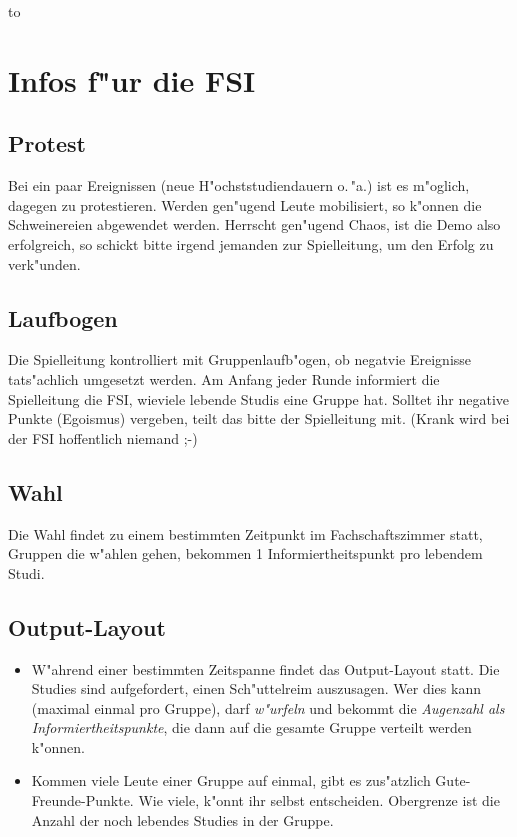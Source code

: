 \documentclass[12pt,a4paper]{article}
\begin{document}
\hbox to\textwidth{\hfill\small vertraulich}


\section*{Infos f"ur die FSI}

\subsection*{Protest}

Bei ein paar Ereignissen (neue H"ochststudiendauern o.\,"a.) ist 
es m"oglich, dagegen zu protestieren. Werden gen"ugend Leute 
mobilisiert, so k"onnen die Schweinereien abgewendet werden. 
Herrscht gen"ugend Chaos, ist die Demo also erfolgreich, so schickt 
bitte irgend jemanden zur Spielleitung, um den Erfolg zu verk"unden.

\subsection*{Laufbogen}

Die Spielleitung kontrolliert mit Gruppenlaufb"ogen, ob
negatvie Ereignisse tats"achlich umgesetzt werden. Am Anfang jeder
Runde informiert die Spielleitung die FSI, wieviele lebende Studis
eine Gruppe hat. Solltet ihr negative Punkte (Egoismus) vergeben,
teilt das bitte der Spielleitung mit. (Krank wird bei der FSI
hoffentlich niemand ;-)


\subsection*{Wahl}

Die Wahl findet zu einem bestimmten Zeitpunkt im Fachschaftszimmer statt,
Gruppen die w"ahlen gehen, bekommen 1 Informiertheitspunkt pro lebendem
Studi.

\subsection*{Output-Layout}

\begin{itemize}
\item
W"ahrend einer bestimmten Zeitspanne findet das Output-Layout statt.
Die Studies sind aufgefordert, einen Sch"uttelreim auszusagen. Wer 
dies kann (maximal einmal pro Gruppe), darf {\em w"urfeln\/} und bekommt 
die {\em Augenzahl als Informiertheitspunkte\/}, die dann auf die gesamte 
Gruppe verteilt werden k"onnen.
\item
Kommen viele Leute einer Gruppe auf einmal, gibt es zus"atzlich 
Gute-Freunde-Punkte. Wie viele, k"onnt ihr selbst entscheiden. 
Obergrenze ist die Anzahl der noch lebendes Studies in der 
Gruppe.
\end{itemize}
\end{document}
